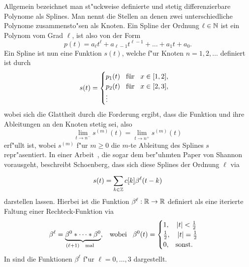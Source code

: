 Allgemein bezeichnet man st"uckweise definierte und stetig differenzierbare Polynome als Splines. 
Man nennt die Stellen an denen zwei unterschiedliche Polynome zusammensto"sen als Knoten. 
Ein Spline der Ordnung $\ell \in \mathbb{N}$ ist ein Polynom vom Grad $\ell$, ist also von der Form
\begin{equation}
    p(t) = 
        a_{\ell} t^{\ell} 
        + a_{\ell - 1} t^{\ell-1} 
        + \dots
        + a_1 t 
        + a_{0}.
\end{equation}
%
Ein Spline ist nun eine Funktion $s(t)$, welche f"ur Knoten $n = 1, 2, \dots$ definiert ist durch
\begin{equation}
    s(t) = \begin{cases}
        p_1(t) {\hspace{3mm} \text{f\"ur} \hspace{3mm}} x \in [1,2], \\
        p_2(t) {\hspace{3mm} \text{f\"ur} \hspace{3mm}} x \in [2,3], \\
        \vdots
    \end{cases}
\end{equation}
wobei sich die Glattheit durch die Forderung ergibt, dass die Funktion und ihre Ableitungen an den Knoten stetig sei, also
\begin{equation}
    \lim\limits_{t \rightarrow n^-} s^{(m)}(t) =
    \lim\limits_{t \rightarrow n^+} s^{(m)}(t)
\end{equation}
erf"ullt ist, wobei $s^{(m)}$ f"ur $m \geqslant 0$ die $m$-te Ableitung des Splines $s$ repr"asentiert. 
In einer Arbeit~\cite{schoenberg1988bsplines}, die sogar dem ber"uhmten Paper von Shannon vorausgeht, beschreibt Schoenberg, dass sich diese Splines der Ordnung $\ell$ via
\begin{equation}\label{eq:bsplines:summation}
    s(t) = {\sum\limits_{k \in \mathbb{Z}}^{}{
        c[k] \beta^{\ell}(t - k)
    }}
\end{equation}
darstellen lassen. Hierbei ist die Funktion $\beta^\ell: \mathbb{R} \rightarrow \mathbb{R}$ definiert als eine iterierte Faltung einer Rechteck-Funktion via
\begin{equation}
    \beta^\ell = \underbrace{
        \beta^0 \ast \dots \ast \beta^0
    }_{(\ell+1) {\hspace{3mm} \text{mal} \hspace{3mm}}}, 
    {\hspace{3mm} \text{wobei} \hspace{3mm}}
    \beta^0(t) = \begin{cases}
        1,\quad {\left| t \right|} < \frac{1}{2} \\
        \frac{1}{2}, \quad {\left| t \right|} = \frac{1}{2} \\
        0, {\hspace{3mm} \text{sonst.} \hspace{3mm}}
    \end{cases}
\end{equation}
In  sind die Funktionen $\beta^\ell$ f"ur $\ell = 0, \dots, 3$ dargestellt. 
